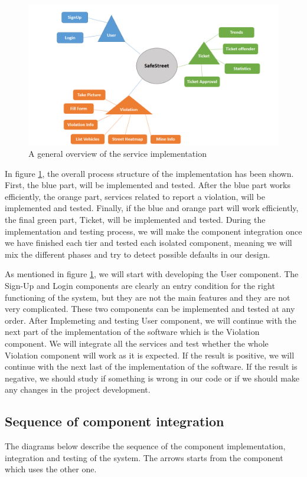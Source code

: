 \begin{figure}
\centering
\includegraphics[width=\textwidth]{Images/ImplemetationandTest.png}
\caption{\label{fig:Test} A general overview of the service implementation}
\end{figure}

In ﬁgure \ref{fig:Test}, the overall process structure of the implementation has been shown. First, the blue part, will be implemented and tested. After the blue part works efficiently, the orange part, services related to report a violation, will be implemented and tested. Finally, if the blue and orange part will work efficiently, the ﬁnal green part, Ticket, will be implemented and tested. During the implementation and testing process, we will make the component integration once we have ﬁnished each tier and tested each isolated component, meaning we will mix the different phases and try to detect possible defaults in our design.

As mentioned in figure \ref{fig:Test}, we will start with developing the User component. The Sign-Up and Login components are clearly an entry condition for the right functioning of the system, but they are not the main features and they are not very complicated. These two components can be implemented and tested at any order. After Implemeting and testing User component, we will continue with the next part of the implementation of the software which is the Violation component. We will integrate all the services and test whether the whole Violation component will work as it is expected. If the result is positive, we will continue with the next last of the implementation of the software. If the result is negative, we should study if something is wrong in our code or if we should make any changes in the project development.

\subsection{Sequence of component integration}
The diagrams below describe the sequence of the component implementation, integration and testing of the system. The arrows starts from the component which uses the other one.

